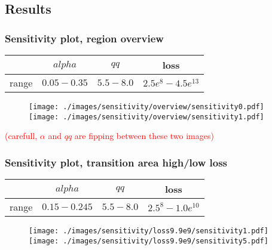\documentclass{beamer}
\begin{document}
\subsection{Results}
\begin{frame}
	\frametitle{Sensitivity plot, region overview}
	\begin{center}
		\begin{tabular}{|c|c|c|c|}
			\hline & $alpha$ & $qq$ & loss \\
			\hline range & $0.05-0.35$ & $5.5-8.0$ & $2.5e^{8}-4.5e^{13}$\\
			\hline
		\end{tabular}
		\begin{figure}
				\hspace{-1.3cm}
				\texttt{[image: ./images/sensitivity/overview/sensitivity0.pdf]}\hspace{-1.0cm}%
				\texttt{[image: ./images/sensitivity/overview/sensitivity1.pdf]}
		\end{figure}
		\textcolor{red}{(carefull, $\alpha$ and $qq$ are fipping between these two images)}
	\end{center}
\end{frame}

\begin{frame}
	\frametitle{Sensitivity plot, transition area high/low loss}
	\begin{center}
		\begin{tabular}{|c|c|c|c|}
			\hline & $alpha$ & $qq$ & loss \\
			\hline range & $0.15-0.245$ & $5.5-8.0$ & $2.5^{8}-1.0e^{10}$\\
			\hline
		\end{tabular}

		\begin{figure}[htbp]
				\hspace{-1.4cm}
				\texttt{[image: ./images/sensitivity/loss9.9e9/sensitivity1.pdf]}\hspace{-1.0cm} %
				\texttt{[image: ./images/sensitivity/loss9.9e9/sensitivity5.pdf]}
		\end{figure}
	\end{center}
\end{frame}
\end{document}
